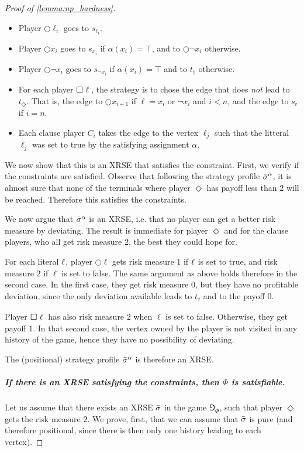 \begin{proof}[Proof of \cref{lemma:np_hardness}]
    \begin{itemize}
        \item Player $\Circle \ell_i$ goes to $s_{\ell_i}$.
        \item Player $\Circle x_i$ goes to $s_{x_i}$ if $\alpha(x_i) = \top$, and to $\Circle \neg x_i$ otherwise.
        \item Player $\Circle\neg x_i$ goes to $s_{\neg x_i}$ if $\alpha(x_i) = \top$ and to $t_\dag$ otherwise.
        \item For each player $\Square \ell$, the strategy is to chose the edge that does \emph{not} lead to $t_\Diamond$. That is, the edge to $\Circle x_{i+1}$ if $\ell = x_i$ or $\neg x_{i}$ and  $i<n$,  and  the edge to $s_\mathsf{r}$ if  $i=n$.
        \item Each clause player $C_i$ takes the edge to the vertex $\ell_j$ such that the litteral $\ell_j$ was set to true by the satisfying assignment $\alpha$. 
    \end{itemize}
     We now show that this is an XRSE that satisfies the constraint. First, we verify if the constraints are satisfied. Observe that following the strategy profile ${\bar{\sigma}}^\alpha$, it is almost sure that none of the terminals where player $\Diamond$ has payoff less than $2$ will be reached. Therefore this satisfies the constraints. 

     We now argue that ${\bar{\sigma}}^\alpha$ is an XRSE, i.e. that no player can get a better risk measure by deviating.
     The result is immediate for player $\Diamond$ and for the clause players, who all get risk measure $2$, the best they could hope for.
     
     For each literal $\ell$, player $\Circle\ell$ gets risk measure $1$ if $\ell$ is set to true, and risk measure $2$ if $\ell$ is set to false.
     The same argument as above holds therefore in the second case.
    In the first case, they get risk measure $0$, but they have no profitable deviation, since the only deviation available leads to $t_\dag$ and to the payoff $0$.
     
     Player $\Square \ell$  has also risk measure  $2$ when $\ell$ is set to false.
     Otherwise, they get payoff $1$. In that second case, the vertex owned by the player is not visited in any history of the game, hence they have no possibility of deviating.

     The (positional) strategy profile ${\bar{\sigma}}^\alpha$ is therefore an XRSE.
     
    \subparagraph*{If there is an XRSE satisfying the constraints, then $\Phi$ is satisfiable.} 
    Let us assume that there exists an XRSE ${\bar{\sigma}}$ in the game $\Game_\Phi$, such that player $\Diamond$ gets the risk measure $2$.
    We prove, first, that we can assume that ${\bar{\sigma}}$ is pure (and therefore positional, since there is then only one history leading to each vertex).


\end{proof}
